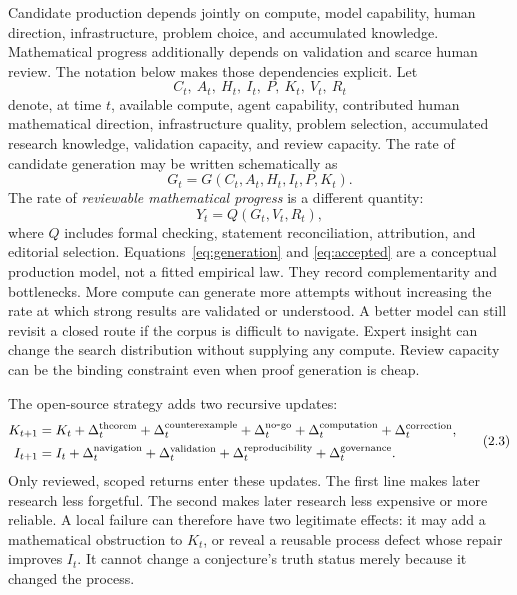 \documentclass[10pt]{article}
\begin{document}
Candidate production depends jointly on compute, model capability, human
direction, infrastructure, problem choice, and accumulated knowledge.
Mathematical progress additionally depends on validation and scarce human
review.  The notation below makes those dependencies explicit.  Let
\[
 C_t,\ A_t,\ H_t,\ I_t,\ P,\ K_t,\ V_t,\ R_t
\]
denote, at time $t$, available compute, agent capability, contributed human
mathematical direction, infrastructure quality, problem selection, accumulated
research knowledge, validation capacity, and review capacity.  The rate of
candidate generation may be written schematically as
\[
 G_t=G(C_t,A_t,H_t,I_t,P,K_t).
\tag{2.1}\label{eq:generation}
\]
The rate of \emph{reviewable mathematical progress} is a different quantity:
\[
 Y_t=Q(G_t,V_t,R_t),
\tag{2.2}\label{eq:accepted}
\]
where $Q$ includes formal checking, statement reconciliation, attribution,
and editorial selection.  Equations~\eqref{eq:generation} and
\eqref{eq:accepted} are a conceptual production model, not a fitted empirical
law.  They record complementarity and bottlenecks.  More compute can generate
more attempts without increasing the rate at which strong results are
validated or understood.  A better model can still revisit a closed route if
the corpus is difficult to navigate.  Expert insight can change the search
distribution without supplying any compute.  Review capacity can be the
binding constraint even when proof generation is cheap.

The open-source strategy adds two recursive updates:
\[
 \begin{aligned}
 K_{t+1}&=K_t+\Delta_t^{\rm theorem}
              +\Delta_t^{\rm counterexample}
              +\Delta_t^{\rm no\mbox{-}go}
              +\Delta_t^{\rm computation}
              +\Delta_t^{\rm correction},\\
 I_{t+1}&=I_t+\Delta_t^{\rm navigation}
              +\Delta_t^{\rm validation}
              +\Delta_t^{\rm reproducibility}
              +\Delta_t^{\rm governance}.
 \end{aligned}
\tag{2.3}\label{eq:feedback}
\]
Only reviewed, scoped returns enter these updates.  The first line makes later
research less forgetful.  The second makes later research less expensive or
more reliable.  A local failure can therefore have two legitimate effects: it
may add a mathematical obstruction to $K_t$, or reveal a reusable process
defect whose repair improves $I_t$.  It cannot change a conjecture's truth
status merely because it changed the process.
\end{document}
